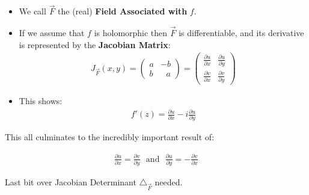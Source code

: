 \begin{itemize}
		\item We call $\vec{F}$ the (real) \textbf{Field Associated with} $f.$ 
		\item If we assume that $f$ is holomorphic then $\vec{F}$ is differentiable, and its derivative is represented by the \textbf{Jacobian Matrix}:
		\begin{align*}
			J_{\vec{F}}(x, y) = \left( \begin{matrix}
				a & -b \\
				b &\,\,\,\,  a 
			\end{matrix}
			\right)
			= \left( \begin{matrix}
				\frac{\partial u}{\partial x} & \frac{\partial u}{\partial y} \\
				\frac{\partial v}{\partial x} & \frac{\partial v}{\partial y}
			\end{matrix} \right)
		\end{align*}
		\item This shows:
		\begin{align*}
			f'(z) = \frac{\partial u}{\partial x} - i\frac{\partial u}{\partial y}
		\end{align*}
\end{itemize}
This all culminates to the incredibly important result of:
\begin{defn}
	\begin{align*}
		\frac{\partial u}{\partial x} = \frac{\partial v}{\partial y} \,\,\,\, \text{and} \,\,\,\, \frac{\partial u}{\partial y} = -\frac{\partial v}{\partial x}
	\end{align*}	
\end{defn}


Last bit over Jacobian Determinant $\triangle_{\vec{F}}$ needed.

\newpage